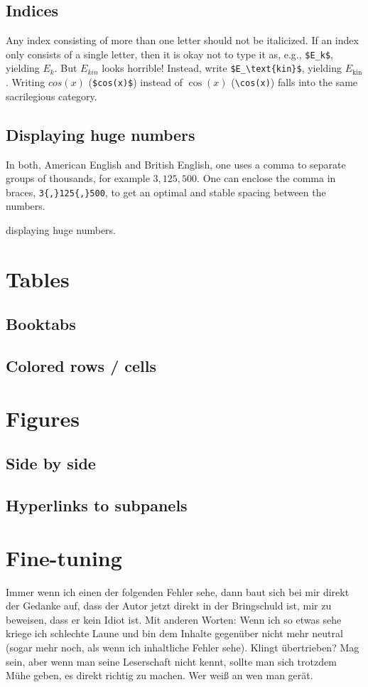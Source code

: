 \subsection{Indices}
Any index consisting of more than one letter should not be italicized.
If an index only consists of a single letter, then it is okay not to type it as, e.g., \verb|$E_k$|, yielding $E_k$. But $E_{kin}$ looks horrible! Instead, write \verb|$E_\text{kin}$|, yielding $E_\text{kin}$.
Writing $cos(x)$ (\verb|$cos(x)$|) instead of $\cos(x)$ (\verb|\cos(x)|) falls into the same sacrilegious category.

\subsection{Displaying huge numbers}
In both, American English and British English, one uses a comma to separate groups of thousands, for example $3{,}125{,}500$. One can enclose the comma in braces, \verb|3{,}125{,}500|, to get an optimal and stable spacing between the numbers. 


displaying huge numbers.
\section{Tables}
\subsection{Booktabs}
\subsection{Colored rows / cells}
\section{Figures}
\subsection{Side by side}
\subsection{Hyperlinks to subpanels}
\section{Fine-tuning}
Immer wenn ich einen der folgenden Fehler sehe, dann baut sich bei mir direkt der Gedanke auf, dass der Autor jetzt direkt in der Bringschuld ist, mir zu beweisen, dass er kein Idiot ist. Mit anderen Worten: Wenn ich so etwas sehe kriege ich schlechte Laune und bin dem Inhalte gegenüber nicht mehr neutral (sogar mehr noch, als wenn ich inhaltliche Fehler sehe). Klingt übertrieben? Mag sein, aber wenn man seine Leserschaft nicht kennt, sollte man sich trotzdem Mühe geben, es direkt richtig zu machen. Wer weiß an wen man gerät.
